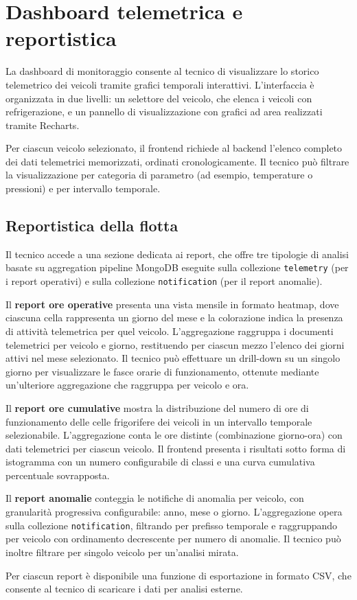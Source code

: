 \section{Dashboard telemetrica e reportistica}
\label{sec:dashboard}

La dashboard di monitoraggio consente al tecnico di visualizzare lo storico telemetrico dei veicoli tramite grafici temporali interattivi. L'interfaccia è organizzata in due livelli: un selettore del veicolo, che elenca i veicoli con refrigerazione, e un pannello di visualizzazione con grafici ad area realizzati tramite Recharts.

Per ciascun veicolo selezionato, il frontend richiede al backend l'elenco completo dei dati telemetrici memorizzati, ordinati cronologicamente. 
Il tecnico può filtrare la visualizzazione per categoria di parametro (ad esempio, temperature o pressioni) e per intervallo temporale. 

\subsection{Reportistica della flotta}

Il tecnico accede a una sezione dedicata ai report, che offre tre tipologie di analisi basate su aggregation pipeline MongoDB eseguite sulla collezione \texttt{telemetry} (per i report operativi) e sulla collezione \texttt{notification} (per il report anomalie).

Il \textbf{report ore operative} presenta una vista mensile in formato heatmap, dove ciascuna cella rappresenta un giorno del mese e la colorazione indica la presenza di attività telemetrica per quel veicolo. L'aggregazione raggruppa i documenti telemetrici per veicolo e giorno, restituendo per ciascun mezzo l'elenco dei giorni attivi nel mese selezionato. Il tecnico può effettuare un drill-down su un singolo giorno per visualizzare le fasce orarie di funzionamento, ottenute mediante un'ulteriore aggregazione che raggruppa per veicolo e ora.

Il \textbf{report ore cumulative} mostra la distribuzione del numero di ore di funzionamento delle celle frigorifere dei veicoli in un intervallo temporale selezionabile. L'aggregazione conta le ore distinte (combinazione giorno-ora) con dati telemetrici per ciascun veicolo. Il frontend presenta i risultati sotto forma di istogramma con un numero configurabile di classi e una curva cumulativa percentuale sovrapposta.

Il \textbf{report anomalie} conteggia le notifiche di anomalia per veicolo, con granularità progressiva configurabile: anno, mese o giorno. L'aggregazione opera sulla collezione \texttt{notification}, filtrando per prefisso temporale e raggruppando per veicolo con ordinamento decrescente per numero di anomalie. Il tecnico può inoltre filtrare per singolo veicolo per un'analisi mirata.

Per ciascun report è disponibile una funzione di esportazione in formato CSV, che consente al tecnico di scaricare i dati per analisi esterne.
